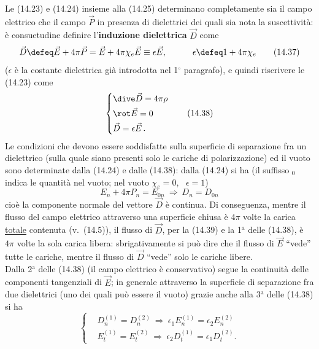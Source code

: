 Le (14.23) e (14.24) insieme alla (14.25) determinano completamente sia il campo
elettrico che il campo $\vec P$ in presenza di dielettrici dei quali sia nota la
suscettivit\`a: \`e consuetudine definire l'\textbf{induzione dielettrica}
$\vec D$ come
\begin{equation}
  \vec D\defeq\vec E+4\pi\vec P=\vec E+4\pi\chi_e\vec E\equiv\epsilon\vec E,
  \qquad\quad\epsilon\defeq1+4\pi\chi_e
  \tag{14.37}
\end{equation}
($\epsilon$ \`e la costante dielettrica gi\`a introdotta nel 1$^\circ$
paragrafo), e quindi riscrivere le (14.23) come
\begin{equation}
  \left\{\begin{aligned}
    &\dive\vec D=4\pi\rho\\
    &\rot\vec E=0\\
    &\vec D=\epsilon\vec E\,.
  \end{aligned}\right.
  \tag{14.38}
\end{equation}
Le condizioni che devono essere soddisfatte sulla superficie di separazione fra
un dielettrico (sulla quale siano presenti solo le cariche di polarizzazione) ed
il vuoto sono determinate dalla (14.24) e dalle (14.38): dalla (14.24) si ha (il
suffisso $_0$ indica le quantit\`a nel vuoto; nel vuoto $\chi_e=0$,
\ $\epsilon=1$)
\begin{equation}
  E_n+4\pi P_n=E_{0n}\ \Rightarrow\ D_n=D_{0n}
  \tag{14.39}
\end{equation}
cio\`e la componente normale del vettore $\vec D$ \`e continua. Di conseguenza,
mentre il flusso del campo elettrico attraverso una superficie chiusa \`e $4\pi$
volte la carica \underline{totale} contenuta
\big(v.\ (14.5)\big), il flusso di $\vec D$, per la (14.39) e la 1$^\mathrm{a}$
delle (14.38), \`e $4\pi$ volte la sola carica libera: sbrigativamente si pu\`o
dire che il flusso di $\vec E$ ``vede'' tutte le cariche, mentre il flusso di
$\vec D$ ``vede'' solo le cariche libere.\\
Dalla 2$^\mathrm{a}$ delle (14.38) (il campo elettrico \`e conservativo) segue
la continuit\`a delle componenti tangenziali di $\vec E$; in generale attraverso
la superficie di separazione fra due dielettrici (uno dei quali pu\`o essere il
vuoto) grazie anche alla 3$^\mathrm{a}$ delle (14.38) si ha
\begin{equation}
  \left\{\begin{aligned}
    &D_n^{(1)}=D_n^{(2)}\ \Rightarrow\ \epsilon_1E_n^{(1)}=\epsilon_2E_n^{(2)}\\
    &E_t^{(1)}=E_t^{(2)}\ \Rightarrow\ \epsilon_2D_t^{(1)}=\epsilon_1D_t^{(2)}.
  \end{aligned}\right.
  \tag{14.40}
\end{equation}
